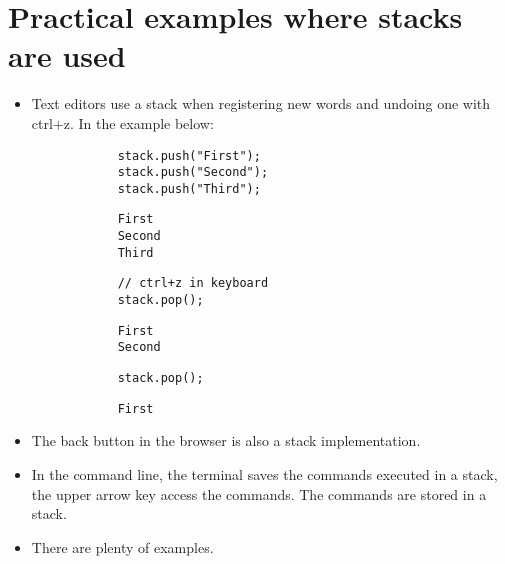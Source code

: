 \section{Practical examples where stacks are used}
\begin{itemize}
    \item Text editors use a stack when registering new words and undoing one with ctrl+z. In the example below:
        \begin{verbatim}
            stack.push("First");
            stack.push("Second");
            stack.push("Third");
        \end{verbatim}
        \begin{lstlisting}
            First 
            Second 
            Third
        \end{lstlisting}
        \begin{verbatim}
            // ctrl+z in keyboard
            stack.pop();
        \end{verbatim}
        \begin{lstlisting}
            First 
            Second 
        \end{lstlisting}
        \begin{verbatim}
            stack.pop();
        \end{verbatim}
        \begin{lstlisting}
            First 
        \end{lstlisting}
    
    \item The back button in the browser is also a stack implementation. 
    \item In the command line, the terminal saves the commands executed in a stack, the upper arrow key access the commands. The commands are stored in a stack. 
    \item There are plenty of examples. 
\end{itemize}

